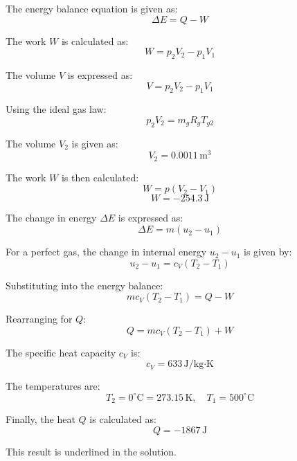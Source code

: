 The energy balance equation is given as:  
\[
\Delta E = Q - W
\]  

The work \( W \) is calculated as:  
\[
W = p_2 V_2 - p_1 V_1
\]  

The volume \( V \) is expressed as:  
\[
V = p_2 V_2 - p_1 V_1
\]  

Using the ideal gas law:  
\[
p_2 V_2 = m_g R_g T_{g2}
\]  

The volume \( V_2 \) is given as:  
\[
V_2 = 0.0011 \, \text{m}^3
\]  

The work \( W \) is then calculated:  
\[
W = p(V_2 - V_1)
\]  
\[
W = -254.3 \, \text{J}
\]  

The change in energy \( \Delta E \) is expressed as:  
\[
\Delta E = m(u_2 - u_1)
\]  

For a perfect gas, the change in internal energy \( u_2 - u_1 \) is given by:  
\[
u_2 - u_1 = c_V (T_2 - T_1)
\]  

Substituting into the energy balance:  
\[
m c_V (T_2 - T_1) = Q - W
\]  

Rearranging for \( Q \):  
\[
Q = m c_V (T_2 - T_1) + W
\]  

The specific heat capacity \( c_V \) is:  
\[
c_V = 633 \, \text{J/kg·K}
\]  

The temperatures are:  
\[
T_2 = 0^\circ\text{C} = 273.15 \, \text{K}, \quad T_1 = 500^\circ\text{C}
\]  

Finally, the heat \( Q \) is calculated as:  
\[
Q = -1867 \, \text{J}
\]  

This result is underlined in the solution.